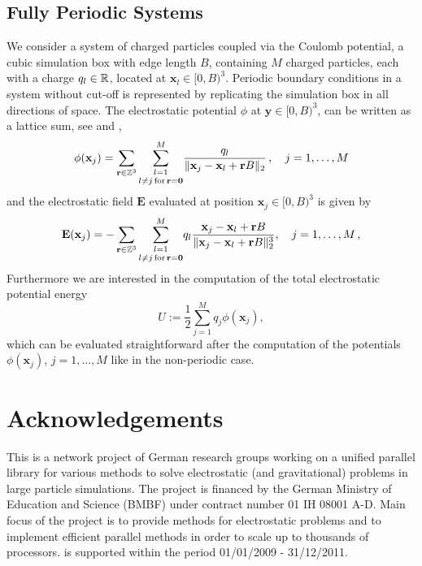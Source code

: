\subsection{Fully Periodic Systems}
We consider a system of charged particles coupled via the Coulomb potential, a cubic simulation box with
edge length $B$, containing $M$ charged particles, each with a charge $q_l\in\mathbb{R}$, located at $\mathbf x_l\in [0,B)^3$.
Periodic boundary conditions in a system without cut-off is represented by replicating the simulation
box in all directions of space.
The electrostatic potential $\phi$ at $\mathbf y\in [0,B)^3$, can be written as a lattice sum,
see \cite[Chapter 12]{FrSm02} and \cite{Sut06},
\begin{equation}\label{eq:potential_3dp}
  \phi(\mathbf x_j)
  = \sum_{\mathbf r\in \mathbb Z^3} \underset{ l\neq j \,{\rm for}\, \mathbf r= \mathbf 0}{\sum_{l=1}^M}
    \frac{q_l}{\|\mathbf x_j -\mathbf x_l +\mathbf r B\|_2}\,,
    \quad j=1,\hdots,M
\end{equation}
and the electrostatic field $\mathbf E$ evaluated at position $\mathbf x_j\in [0,B)^3$ is given by
\begin{equation}\label{eq:fields_3dp}
  \mathbf E(\mathbf x_j)
  = - \sum_{\mathbf r\in \mathbb Z^3}
    \underset{ l\neq j \,{\rm for}\, \mathbf r= \mathbf 0}{\sum_{l=1}^M}
    q_l \frac{\mathbf x_j -\mathbf x_l +\mathbf r B}{\|\mathbf x_j -\mathbf x_l +\mathbf r B \|_2^3},
    \quad j=1,\hdots,M\, ,
\end{equation}
Furthermore we are interested in the computation of the total electrostatic potential energy
\begin{equation*}
  U := \frac{1}{2} \sum\limits_{j = 1}^{M} q_j \phi(\mathbf x_j),
\end{equation*}
which can be evaluated straightforward after the computation
of the potentials $\phi(\mathbf x_j)$, $j=1,\hdots,M$ like in the non-periodic case.




\section{Acknowledgements}

This is a network project of German research groups working on a
unified parallel library for various methods to solve electrostatic
(and gravitational) problems in large particle simulations. The
project is financed by the German Ministry of Education and Science
(BMBF) under contract number 01 IH 08001 A-D.  Main focus of the
project is to provide methods for electrostatic problems and to
implement efficient parallel methods in order to scale up to thousands
of processors.  \fcs is supported within the period 01/01/2009 -
31/12/2011.


